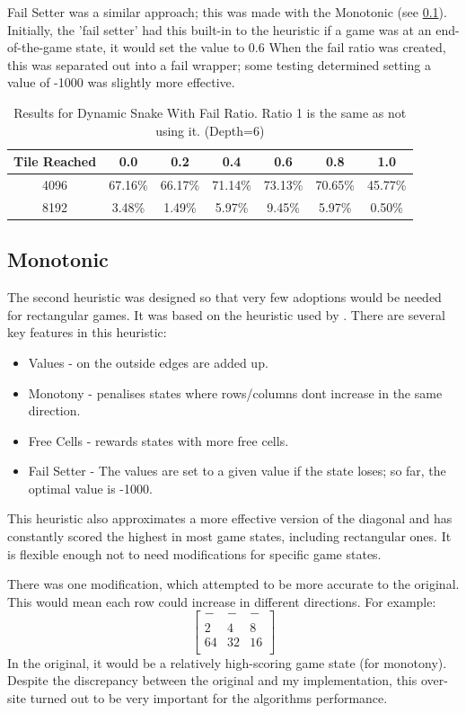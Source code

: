 \documentclass{article}
\begin{document}
Fail Setter was a similar approach; this was made with the Monotonic  (see \ref{subsec:mono}). Initially, the 'fail setter' had this built-in to the heuristic if a game was at an end-of-the-game state, it would set the value to 0.6 When the fail ratio was created, this was separated out into a fail wrapper; some testing determined setting a value of -1000 was slightly more effective. 
\begin{table}
    \centering
\begin{tabular}{|c|c c c c c c|}
    \hline
    Tile Reached & 0.0 & 0.2 & 0.4 & 0.6 & 0.8 & 1.0  \\
    \hline
     4096 & 67.16\%&66.17\%&71.14\%&73.13\%&70.65\%&45.77\%\\
     8192 &3.48\%&1.49\%&5.97\%&9.45\%&5.97\%&0.50\%\\
     \hline
\end{tabular}
    \caption{Results for Dynamic Snake With Fail Ratio. Ratio 1 is the same as not using it. (Depth=6)}
    \label{tab:dsfail}
\end{table}

\subsection{Monotonic}
\label{subsec:mono}
The second heuristic was designed so that very few adoptions would be needed for rectangular games. It was based on the heuristic used by \cite{_16k2048ai}. There are several key features in this heuristic:
\begin{itemize}
    \item Values - on the outside edges are added up.
    \item Monotony - penalises states where rows/columns don\textquotesingle t increase in the same direction.
    \item Free Cells - rewards states with more free cells.
    \item Fail Setter - The values are set to a given value if the state loses; so far, the optimal value is -1000.
\end{itemize}
This heuristic also approximates a more effective version of the diagonal and has constantly scored the highest in most game states, including rectangular ones. It is flexible enough not to need modifications for specific game states.

There was one modification, which attempted to be more accurate to the original. This would mean each row could increase in different directions. For example:
\[
\begin{bmatrix}
    -&-&-\\
    2&4&8\\
    64&32&16\\
\end{bmatrix}
\]
In the original, it would be a relatively high-scoring game state (for monotony).
Despite the discrepancy between the original and my implementation, this over-site
turned out to be very important for the algorithm\textquotesingle s performance.
\end{document}
